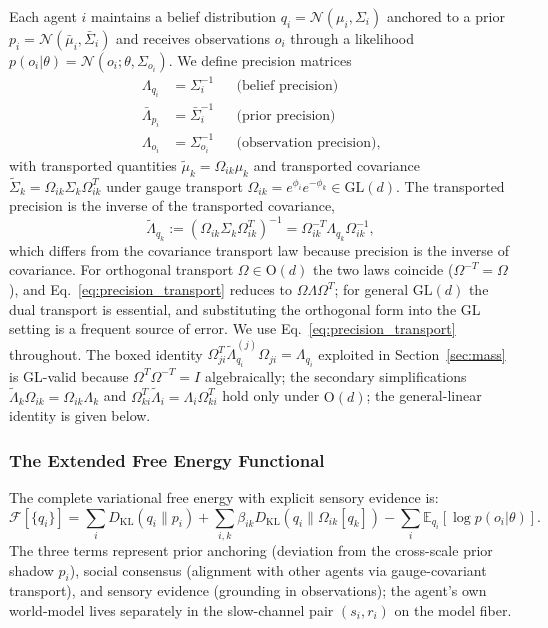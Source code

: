 \documentclass[11pt]{article}
\begin{document}
Each agent $i$ maintains a belief distribution $q_i = \mathcal{N}(\mu_i, \Sigma_i)$ anchored to a prior $p_i = \mathcal{N}(\bar{\mu}_i, \bar{\Sigma}_i)$ and receives observations $o_i$ through a likelihood $p(o_i | \theta) = \mathcal{N}(o_i; \theta, \Sigma_{o_i})$. We define precision matrices
\begin{align}
\Lambda_{q_i} &= \Sigma_i^{-1} & &\text{(belief precision)} \\
\bar{\Lambda}_{p_i} &= \bar{\Sigma}_i^{-1} & &\text{(prior precision)} \\
\Lambda_{o_i} &= \Sigma_{o_i}^{-1} & &\text{(observation precision)},
\end{align}
with transported quantities $\tilde{\mu}_k = \Omega_{ik}\mu_k$ and transported covariance $\tilde{\Sigma}_k = \Omega_{ik}\Sigma_k\Omega_{ik}^T$ under gauge transport $\Omega_{ik} = e^{\phi_i}e^{-\phi_k} \in \mathrm{GL}(d)$. The transported precision is the inverse of the transported covariance,
\begin{equation}
\tilde{\Lambda}_{q_k} := (\Omega_{ik}\Sigma_k\Omega_{ik}^T)^{-1} = \Omega_{ik}^{-T}\Lambda_{q_k}\Omega_{ik}^{-1},
\label{eq:precision_transport}
\end{equation}
which differs from the covariance transport law because precision is the inverse of covariance. For orthogonal transport $\Omega \in \mathrm{O}(d)$ the two laws coincide ($\Omega^{-T} = \Omega$), and Eq.~\eqref{eq:precision_transport} reduces to $\Omega\Lambda\Omega^T$; for general $\mathrm{GL}(d)$ the dual transport is essential, and substituting the orthogonal form into the GL setting is a frequent source of error. We use Eq.~\eqref{eq:precision_transport} throughout. The boxed identity $\Omega_{ji}^T \tilde{\Lambda}_{q_i}^{(j)} \Omega_{ji} = \Lambda_{q_i}$ exploited in Section~\ref{sec:mass} is GL-valid because $\Omega^T \Omega^{-T} = I$ algebraically; the secondary simplifications $\tilde{\Lambda}_k\Omega_{ik} = \Omega_{ik}\Lambda_k$ and $\Omega_{ki}^T\tilde\Lambda_i = \Lambda_i\Omega_{ki}^T$ hold only under $\mathrm{O}(d)$; the general-linear identity is given below.

\subsubsection{The Extended Free Energy Functional}

The complete variational free energy with explicit sensory evidence is:
\begin{equation}
\mathcal{F}[\{q_i\}] = \sum_i D_{\mathrm{KL}}(q_i \| p_i) + \sum_{i,k} \beta_{ik} D_{\mathrm{KL}}(q_i \| \Omega_{ik}[q_k]) - \sum_i \mathbb{E}_{q_i}[\log p(o_i | \theta)].
\label{eq:extended_free_energy}
\end{equation}
The three terms represent prior anchoring (deviation from the cross-scale prior shadow $p_i$), social consensus (alignment with other agents via gauge-covariant transport), and sensory evidence (grounding in observations); the agent's own world-model lives separately in the slow-channel pair $(s_i, r_i)$ on the model fiber.
\end{document}
